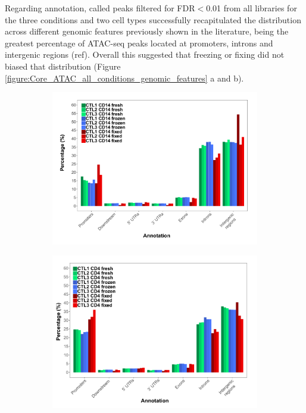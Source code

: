 




Regarding annotation, called peaks filtered for FDR$<$0.01 from all libraries for the three conditions and two cell types successfully recapitulated the distribution across different genomic features previously shown in the literature, being the greatest percentage of ATAC-seq peaks located at promoters, introns and intergenic regions (ref). Overall this suggested that freezing or fixing did not biased that distribution (Figure \ref{figure:Core_ATAC_all_conditions_genomic_features} a and b).  
 
\begin{figure}[htbp]
\centering
\begin{subfigure}{0.5\textwidth}
\centering
\includegraphics[width=\textwidth]{./Results1/pdfs/Core_ATAC_CD14_fresh_frozen_fixed_general_peak_annotation}
\caption{\textbf{}}
\end{subfigure}%
\begin{subfigure}{0.5\textwidth}
\centering
\includegraphics[width=\textwidth]{./Results1/pdfs/Core_ATAC_CD4_fresh_frozen_fixed_general_peak_annotation}

\end{subfigure}
\end{figure}
